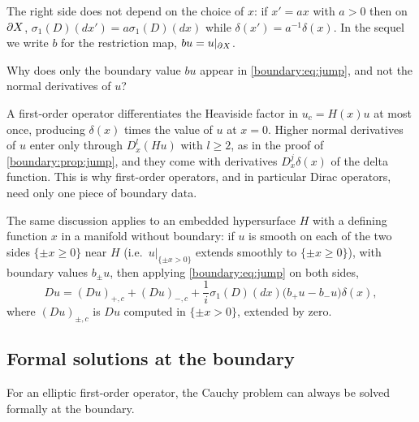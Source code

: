 The right side does not depend on the choice of $x$: if $x'=ax$ with $a>0$ then on
$\partial X$, $\sigma_1(D)(dx')=a\sigma_1(D)(dx)$ while $\delta(x')=a^{-1}\delta(x)$. In
the sequel we write $b$ for the restriction map, $bu=u|_{\partial X}$.

\begin{question}
Why does only the boundary value $bu$ appear in \eqref{boundary:eq:jump}, and not the
normal derivatives of $u$?
\end{question}
\begin{answer}
A first-order operator differentiates the Heaviside factor in $u_c=H(x)u$ at most
once, producing $\delta(x)$ times the value of $u$ at $x=0$. Higher normal
derivatives of $u$ enter only through $D_x^l(Hu)$ with $l\ge2$, as in the proof of
\cref{boundary:prop:jump}, and they come with derivatives $D_x^j\delta(x)$ of the
delta function. This is why first-order operators, and in particular Dirac operators,
need only one piece of boundary data.
\end{answer}

The same discussion applies to an embedded hypersurface $H$ with a defining function
$x$ in a manifold without boundary: if $u$ is smooth on each of the two sides
$\{\pm x\ge0\}$ near $H$ (i.e.\ $u|_{\{\pm x>0\}}$ extends smoothly to $\{\pm x\ge0\}$),
with boundary values $b_\pm u$, then applying \eqref{boundary:eq:jump} on both sides,
\begin{equation}\label{boundary:eq:jump-two}
Du=(Du)_{+,c}+(Du)_{-,c}+\frac1i\sigma_1(D)(dx)\big(b_+u-b_-u\big)\delta(x),
\end{equation}
where $(Du)_{\pm,c}$ is $Du$ computed in $\{\pm x>0\}$, extended by zero.

\subsection*{Formal solutions at the boundary}
For an elliptic first-order operator, the Cauchy problem can always be solved
formally at the boundary.

